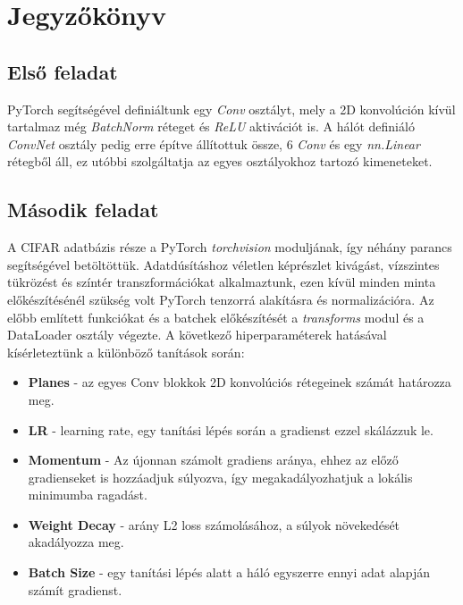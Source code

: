 \chapter{Jegyzőkönyv}
\section{Első feladat}
PyTorch segítségével definiáltunk egy \textit{Conv} osztályt, mely a 2D konvolúción kívül tartalmaz még \textit{BatchNorm} réteget és \textit{ReLU} aktivációt is. A hálót definiáló \textit{ConvNet} osztály pedig erre építve állítottuk össze, 6 \textit{Conv} és egy \textit{nn.Linear} rétegből áll, ez utóbbi szolgáltatja az egyes osztályokhoz tartozó kimeneteket.
\section{Második feladat}
A CIFAR adatbázis része a PyTorch \textit{torchvision} moduljának, így néhány parancs segítségével betöltöttük. Adatdúsításhoz véletlen képrészlet kivágást, vízszintes tükrözést és színtér transzformációkat alkalmaztunk, ezen kívül minden minta előkészítésénél szükség volt PyTorch tenzorrá alakításra és normalizációra. Az előbb említett funkciókat és a batchek előkészítését a \textit{transforms} modul és a DataLoader osztály végezte.
A következő hiperparaméterek hatásával kísérleteztünk a különböző tanítások során:

\begin{itemize}
	\item \textbf{Planes} - az egyes Conv blokkok 2D konvolúciós rétegeinek számát határozza meg.
	\item \textbf{LR} - learning rate, egy tanítási lépés során a gradienst ezzel skálázzuk le.
	\item \textbf{Momentum} - Az újonnan számolt gradiens aránya, ehhez az előző gradienseket is hozzáadjuk súlyozva, így megakadályozhatjuk a lokális minimumba ragadást.
	\item \textbf{Weight Decay} - arány L2 loss számolásához, a súlyok növekedését akadályozza meg.
	\item \textbf{Batch Size} - egy tanítási lépés alatt a háló egyszerre ennyi adat alapján számít gradienst.
\end{itemize}

